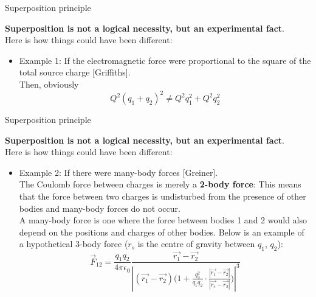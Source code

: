 %
%
%

\begin{frame}[t]{Superposition principle}

{\bf Superposition is not a logical necessity, but an experimental fact}.\\
\vspace{0.3cm}
Here is how things could have been different:\\
\vspace{0.2cm}

\begin{itemize}
\item
  Example 1:
  {\color{magenta} If the electromagnetic force were proportional to the square of the total source charge} [Griffiths].\\
  \vspace{0.2cm}
  Then, obviously
  \begin{equation*}
    Q^2 (q_1 + q_2)^2 \ne Q^2 q_1^2 +  Q^2 q_2^2
  \end{equation*}
\end{itemize}

\end{frame}

%
%
%

\begin{frame}[t]{Superposition principle}

{\bf Superposition is not a logical necessity, but an experimental fact}.\\
\vspace{0.3cm}
Here is how things could have been different:\\
\vspace{0.2cm}

\begin{itemize}
\item
Example 2:
  {\color{magenta} If there were many-body forces} [Greiner].\\
  \vspace{0.2cm}
  {\small
  The Coulomb force between charges is merely a {\bf 2-body force}:
  This means that the force between two charges is undisturbed from the presence
  of other bodies and many-body forces do not occur. \\
  \vspace{0.2cm}
  A many-body force is one where the force between bodies 1 and 2 would also
  depend on the positions and charges of other bodies.
  Below is an example of a hypothetical 3-body force
  ($r_s$ is the centre of gravity between $q_1$, $q_2$):\\
  }
  {\Large
  \begin{equation*}
    \vec{F}_{12} = \frac{q_1 q_2}{4\pi\epsilon_0}
       \frac{\vec{r_1} - \vec{r_2}}
            {|(\vec{r_1} - \vec{r_2}) \Big( 1 + \frac{q_3^2}{q_1 q_2} \cdot \frac{|\vec{r_1} - \vec{r_2}|}{|\vec{r_s} - \vec{r_3}|} \Big)|^3}
  \end{equation*}
  }
\end{itemize}

\end{frame}

